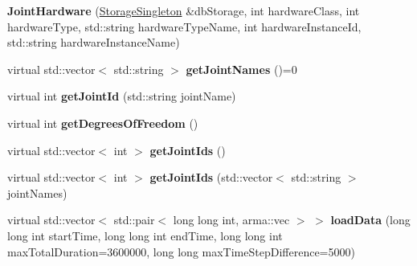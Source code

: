 \begin{DoxyCompactItemize}
\item 
{\bfseries Joint\+Hardware} (\hyperlink{classkukadu_1_1StorageSingleton}{Storage\+Singleton} \&db\+Storage, int hardware\+Class, int hardware\+Type, std\+::string hardware\+Type\+Name, int hardware\+Instance\+Id, std\+::string hardware\+Instance\+Name)\hypertarget{classkukadu_1_1JointHardware_a0514e200c960e5246107dff0dbee11da}{}\label{classkukadu_1_1JointHardware_a0514e200c960e5246107dff0dbee11da}

\item 
virtual std\+::vector$<$ std\+::string $>$ {\bfseries get\+Joint\+Names} ()=0\hypertarget{classkukadu_1_1JointHardware_a8fe0e6ef38735e335070d206b798ad26}{}\label{classkukadu_1_1JointHardware_a8fe0e6ef38735e335070d206b798ad26}

\item 
virtual int {\bfseries get\+Joint\+Id} (std\+::string joint\+Name)\hypertarget{classkukadu_1_1JointHardware_a6f2a9128511dcc626932bee6850cd833}{}\label{classkukadu_1_1JointHardware_a6f2a9128511dcc626932bee6850cd833}

\item 
virtual int {\bfseries get\+Degrees\+Of\+Freedom} ()\hypertarget{classkukadu_1_1JointHardware_a6e1bbab3cb82d94f3154060d5a8ee62a}{}\label{classkukadu_1_1JointHardware_a6e1bbab3cb82d94f3154060d5a8ee62a}

\item 
virtual std\+::vector$<$ int $>$ {\bfseries get\+Joint\+Ids} ()\hypertarget{classkukadu_1_1JointHardware_a556b26ac4e21479009fb661cb2a9b943}{}\label{classkukadu_1_1JointHardware_a556b26ac4e21479009fb661cb2a9b943}

\item 
virtual std\+::vector$<$ int $>$ {\bfseries get\+Joint\+Ids} (std\+::vector$<$ std\+::string $>$ joint\+Names)\hypertarget{classkukadu_1_1JointHardware_a5629c63268491477ace5210e8ed1721d}{}\label{classkukadu_1_1JointHardware_a5629c63268491477ace5210e8ed1721d}

\item 
virtual std\+::vector$<$ std\+::pair$<$ long long int, arma\+::vec $>$ $>$ {\bfseries load\+Data} (long long int start\+Time, long long int end\+Time, long long int max\+Total\+Duration=3600000, long long max\+Time\+Step\+Difference=5000)\hypertarget{classkukadu_1_1JointHardware_a8145b779bc5fbda910d4c412e18dabe8}{}\label{classkukadu_1_1JointHardware_a8145b779bc5fbda910d4c412e18dabe8}

\end{DoxyCompactItemize}
